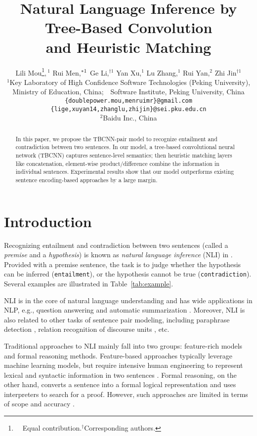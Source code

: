\documentclass[11pt]{article}
\title{Natural Language Inference by Tree-Based Convolution\\ and Heuristic Matching}
\author{Lili Mou\thanks{\ \ Equal contribution.\quad $^\dag$Corresponding authors.},\,$^{1}$ Rui Men,\hspace{-.11cm}$^{*\hspace{0.01cm}1}$ Ge Li,\!$^{\dag1}$ Yan Xu,$^{1}$ Lu Zhang,$^{1}$ Rui Yan,$^2$ Zhi Jin$^{\dag1}$\\
\normalsize $^{1}$Key Laboratory of High Confidence Software Technologies (Peking University),\\\normalsize
Ministry of Education, China;\ \ Software Institute, Peking University, China\\\normalsize
{\tt \{doublepower.mou,menruimr\}@gmail.com}\\ \normalsize
{\tt \{lige,xuyan14,zhanglu,zhijin\}@sei.pku.edu.cn}\\\normalsize
$^{2}$Baidu Inc., China\quad {\tt yanrui02@baidu.com}
}
\date{}
\begin{document}
\renewcommand{\headrulewidth}{0pt}
\thispagestyle{fancy}

\maketitle

\begin{abstract}
In this paper, we propose the TBCNN-pair model to recognize entailment and contradiction between two sentences. In our model, a tree-based convolutional neural network (TBCNN) captures sentence-level semantics; then heuristic matching layers like concatenation, element-wise product/difference combine the information in individual sentences. Experimental results show that our model outperforms existing sentence encoding-based approaches by a large margin.
\end{abstract}


\section{Introduction}

Recognizing entailment and contradiction between two sentences (called a \textit{premise} and a \textit{hypothesis}) is known as \textit{natural language inference} (NLI) in . Provided with a premise sentence, the task is to judge whether the hypothesis can be inferred ({\tt entailment}), or the hypothesis cannot be true ({\tt contradiction}). Several examples are illustrated in Table~\ref{tab:example}.




NLI is in the core of natural language understanding and has wide applications in NLP, e.g., question answering \cite{QA} and automatic summarization \cite{summarization,summarization2,summarization3}. Moreover, NLI is also related to other tasks of sentence pair modeling, including  paraphrase detection \cite{CNN:NIPS}, relation recognition of discourse units \cite{DRR-aaai}, etc.

Traditional approaches to NLI mainly fall into two groups: feature-rich models and formal reasoning methods. Feature-based approaches typically leverage machine learning models, but require intensive human engineering to represent lexical and syntactic information in two sentences \cite{feature1,feature2}. Formal reasoning, on the other hand, converts a sentence into a formal logical representation and uses interpreters to search for a proof. However, such approaches are limited in terms of scope and accuracy \cite{formal}. 
\end{document}
